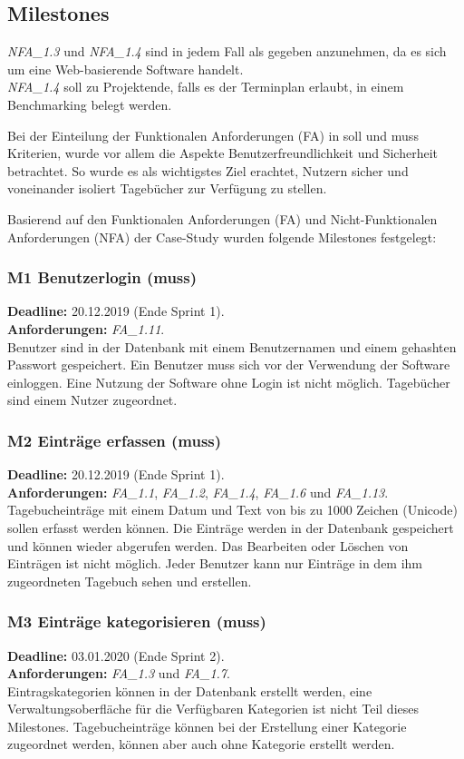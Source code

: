 \subsection{Milestones}
\emph{NFA\_1.3} und \emph{NFA\_1.4} sind in jedem Fall als gegeben anzunehmen, da es sich um eine Web-basierende Software handelt.\\
\emph{NFA\_1.4} soll zu Projektende, falls es der Terminplan erlaubt, in einem Benchmarking belegt werden.

\vspace{3mm}
\noindent
Bei der Einteilung der Funktionalen Anforderungen (FA) in soll und muss Kriterien, wurde vor allem die Aspekte Benutzerfreundlichkeit und Sicherheit betrachtet. So wurde es als wichtigstes Ziel erachtet, Nutzern sicher und voneinander isoliert Tagebücher zur Verfügung zu stellen.

Basierend auf den Funktionalen Anforderungen (FA) und Nicht-Funktionalen Anforderungen (NFA) der Case-Study wurden folgende Milestones festgelegt:

\subsubsection{M1 Benutzerlogin (muss)}
\textbf{Deadline: } 20.12.2019 (Ende Sprint 1). \\
\textbf{Anforderungen: }\emph{FA\_1.11}.\\
Benutzer sind in der Datenbank mit einem Benutzernamen und einem gehashten Passwort gespeichert. Ein Benutzer muss sich vor der Verwendung der Software einloggen. Eine Nutzung der Software ohne Login ist nicht möglich. Tagebücher sind einem Nutzer zugeordnet.

\subsubsection{M2 Einträge erfassen (muss)}
\textbf{Deadline: } 20.12.2019 (Ende Sprint 1). \\
\textbf{Anforderungen: }\emph{FA\_1.1}, \emph{FA\_1.2}, \emph{FA\_1.4}, \emph{FA\_1.6} und \emph{FA\_1.13}.\\
Tagebucheinträge mit einem Datum und Text von bis zu 1000 Zeichen (Unicode) sollen erfasst werden können. Die Einträge werden in der Datenbank gespeichert und können wieder abgerufen werden. Das Bearbeiten oder Löschen von Einträgen ist nicht möglich. Jeder Benutzer kann nur Einträge in dem ihm zugeordneten Tagebuch sehen und erstellen.

\subsubsection{M3 Einträge kategorisieren (muss)}
\textbf{Deadline: } 03.01.2020 (Ende Sprint 2). \\
\textbf{Anforderungen: }\emph{FA\_1.3} und \emph{FA\_1.7}.\\
Eintragskategorien können in der Datenbank erstellt werden, eine Verwaltungsoberfläche für die Verfügbaren Kategorien ist nicht Teil dieses Milestones. Tagebucheinträge können bei der Erstellung einer Kategorie zugeordnet werden, können aber auch ohne Kategorie erstellt werden.


